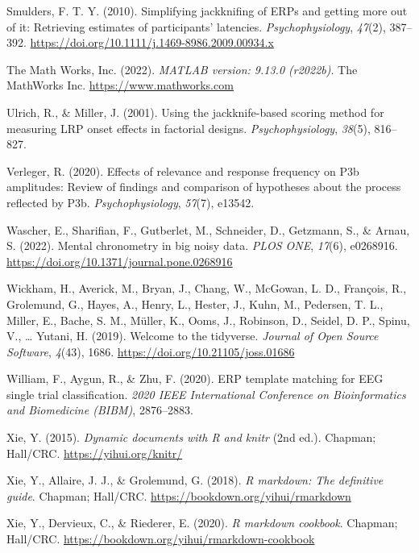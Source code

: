 \documentclass[
  man]{apa7}
\newlength{\cslhangindent}
\newlength{\cslentryspacingunit} %
\newenvironment{CSLReferences}[2] %
 {%
  \setlength{\parindent}{0pt}
  \ifodd #1
  \let\oldpar\par
  \def\par{\hangindent=\cslhangindent\oldpar}
  \fi
  \setlength{\parskip}{#2\cslentryspacingunit}
 }%
 {}
\begin{document}
\begin{CSLReferences}{1}{0}
\leavevmode{}%
Smulders, F. T. Y. (2010). Simplifying jackknifing of {ERPs} and getting more out of it: {Retrieving} estimates of participants' latencies. \emph{Psychophysiology}, \emph{47}(2), 387--392. \url{https://doi.org/10.1111/j.1469-8986.2009.00934.x}

\leavevmode{}%
The Math Works, Inc. (2022). \emph{{MATLAB} version: 9.13.0 (r2022b)}. The MathWorks Inc. \url{https://www.mathworks.com}

\leavevmode{}%
Ulrich, R., \& Miller, J. (2001). Using the jackknife-based scoring method for measuring {LRP} onset effects in factorial designs. \emph{Psychophysiology}, \emph{38}(5), 816--827.

\leavevmode{}%
Verleger, R. (2020). Effects of relevance and response frequency on {P3b} amplitudes: {Review} of findings and comparison of hypotheses about the process reflected by {P3b}. \emph{Psychophysiology}, \emph{57}(7), e13542.

\leavevmode{}%
Wascher, E., Sharifian, F., Gutberlet, M., Schneider, D., Getzmann, S., \& Arnau, S. (2022). Mental chronometry in big noisy data. \emph{PLOS ONE}, \emph{17}(6), e0268916. \url{https://doi.org/10.1371/journal.pone.0268916}

\leavevmode{}%
Wickham, H., Averick, M., Bryan, J., Chang, W., McGowan, L. D., François, R., Grolemund, G., Hayes, A., Henry, L., Hester, J., Kuhn, M., Pedersen, T. L., Miller, E., Bache, S. M., Müller, K., Ooms, J., Robinson, D., Seidel, D. P., Spinu, V., \ldots{} Yutani, H. (2019). Welcome to the {tidyverse}. \emph{Journal of Open Source Software}, \emph{4}(43), 1686. \url{https://doi.org/10.21105/joss.01686}

\leavevmode{}%
William, F., Aygun, R., \& Zhu, F. (2020). {ERP} template matching for {EEG} single trial classification. \emph{2020 {IEEE} International Conference on Bioinformatics and Biomedicine ({BIBM})}, 2876--2883.

\leavevmode{}%
Xie, Y. (2015). \emph{Dynamic documents with {R} and knitr} (2nd ed.). Chapman; Hall/CRC. \url{https://yihui.org/knitr/}

\leavevmode{}%
Xie, Y., Allaire, J. J., \& Grolemund, G. (2018). \emph{R markdown: The definitive guide}. Chapman; Hall/CRC. \url{https://bookdown.org/yihui/rmarkdown}

\leavevmode{}%
Xie, Y., Dervieux, C., \& Riederer, E. (2020). \emph{R markdown cookbook}. Chapman; Hall/CRC. \url{https://bookdown.org/yihui/rmarkdown-cookbook}

\end{CSLReferences}
\end{document}

